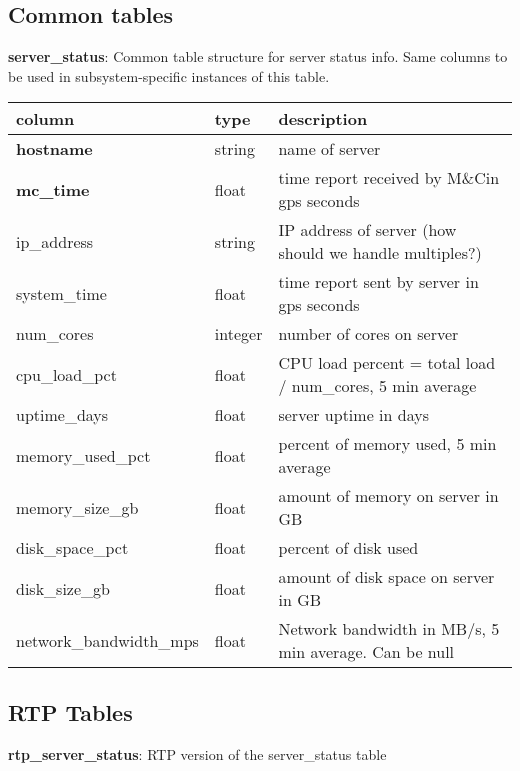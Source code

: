 \documentclass{article}
\newcommand{\mc}{M\&C}
\begin{document}
\subsection{Common tables}
\textbf{\large{server\_status}}: Common table structure for server status info. Same columns to be used in subsystem-specific instances of this table.
\begin{center}
 \begin{tabular}{| p{4cm} | p{2cm} | p{10cm} |} 
\hline
 column & type & description \\ [0.5ex]  \hline\hline
 \textbf{hostname} & string &  name of server \\ \hline
 \textbf{mc\_time} & float & time report received by \mc in gps seconds \\ \hline
 ip\_address & string & IP address of server (how should we handle multiples?) \\\hline
system\_time & float & time report sent by server in gps seconds \\\hline
num\_cores & integer & number of cores on server \\\hline
cpu\_load\_pct & float & CPU load percent = total load / num\_cores, 5 min average  \\\hline
uptime\_days & float & server uptime in days  \\\hline
memory\_used\_pct & float & percent of memory used, 5 min average  \\\hline
memory\_size\_gb & float & amount of memory on server in GB \\\hline
disk\_space\_pct & float & percent of disk used  \\\hline
disk\_size\_gb & float & amount of disk space on server in GB \\\hline
network\_bandwidth\_mps & float & Network bandwidth in MB/s, 5 min average. Can be null \\\hline
\end{tabular}
\end{center}

\subsection{RTP Tables}
\textbf{\large{rtp\_server\_status}}: RTP version of the server\_status table\\
\end{document}
